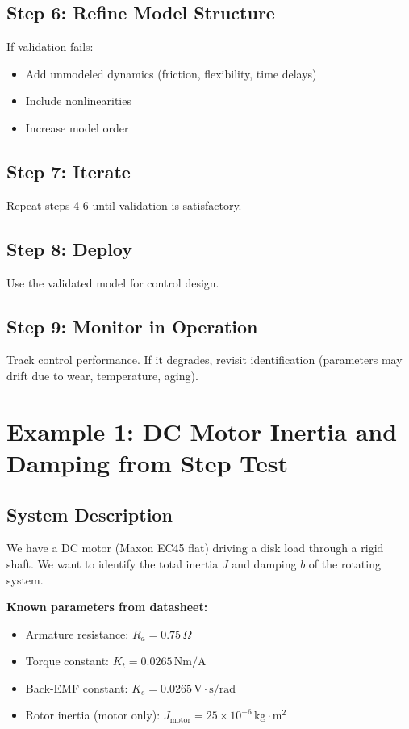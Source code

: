 \subsection{Step 6: Refine Model Structure}
If validation fails:
\begin{itemize}
    \item Add unmodeled dynamics (friction, flexibility, time delays)
    \item Include nonlinearities
    \item Increase model order
\end{itemize}

\subsection{Step 7: Iterate}
Repeat steps 4-6 until validation is satisfactory.

\subsection{Step 8: Deploy}
Use the validated model for control design.

\subsection{Step 9: Monitor in Operation}
Track control performance. If it degrades, revisit identification (parameters may drift due to wear, temperature, aging).

\section{Example 1: DC Motor Inertia and Damping from Step Test}

\subsection{System Description}

We have a DC motor (Maxon EC45 flat) driving a disk load through a rigid shaft. We want to identify the total inertia $J$ and damping $b$ of the rotating system.

\textbf{Known parameters from datasheet:}
\begin{itemize}
    \item Armature resistance: $R_a = 0.75 \, \Omega$
    \item Torque constant: $K_t = 0.0265 \, \text{Nm/A}$
    \item Back-EMF constant: $K_e = 0.0265 \, \text{V}\cdot\text{s/rad}$
    \item Rotor inertia (motor only): $J_{\text{motor}} = 25 \times 10^{-6} \, \text{kg}\cdot\text{m}^2$
\end{itemize}

